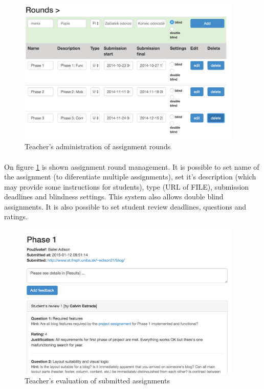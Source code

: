 \begin{figure}[h]
    \centering
    \includegraphics[width=0.95\textwidth]{images/teacherrounds.png}
    \caption{Teacher's administration of assignment rounds}
    \label{teacherrounds}
\end{figure}

\paragraph{}
On figure \ref{teacherrounds} is shown assignment round management. It is possible to set name of the assignment (to diferentiate multiple assignments), set it's description (which may provide some instructions for students), type (URL of FILE), submission deadlines and blindness settings. This system also allows double blind assignments. It is also possible to set student review deadlines, questions and ratings.

\begin{figure}[h]
    \centering
    \includegraphics[width=0.95\textwidth]{images/teachereval.png}
    \caption{Teacher's evaluation of submitted assignments}
    \label{teachereval}
\end{figure}

